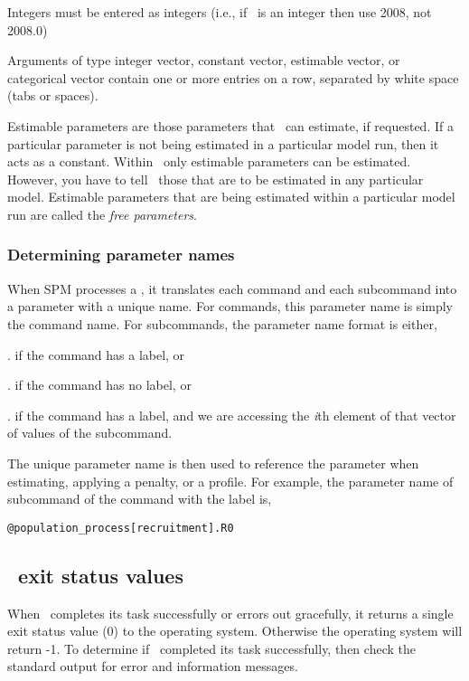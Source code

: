 Integers must be entered as integers (i.e., if \ is an integer then use 2008, not 2008.0)

Arguments of type integer vector, constant vector, estimable vector, or categorical vector contain one or more entries on a row, separated by white space (tabs or spaces). 

Estimable parameters are those parameters that \SPM\ can estimate, if requested. If a particular parameter is not being estimated in a particular model run, then it acts as a constant.  Within \SPM\, only estimable parameters can be estimated. However, you have to tell \SPM\ those that are to be estimated in any particular model. Estimable parameters that are being estimated within a particular model run are called the \emph{free parameters}.

\subsubsection{Determining parameter names}

When SPM processes a \config, it translates each command and each subcommand into a parameter with a unique name. For commands, this parameter name is simply the command name. For subcommands, the parameter name format is either, 

\begin{description}
\item {}\subcommand{[label]}. if the command has a label, or
\item {}. if the command has no label, or
\item {}\subcommand{[label]}.\subcommand{[i]} if the command has a label, and we are accessing the \emph{i}th element of that vector of values of the subcommand.
\end{description} 

The unique parameter name is then used to reference the parameter when estimating, applying a penalty, or a profile. For example, the parameter name of subcommand  of the command  with the label  is,

\texttt{@population\_process[recruitment].R0}

\subsection{\SPM\ exit status values}

When \SPM\ completes its task successfully or errors out gracefully, it returns a single exit status value (0) to the operating system. Otherwise the operating system will return -1. To determine if \SPM\ completed its task successfully, then check the standard output for error and information messages.
